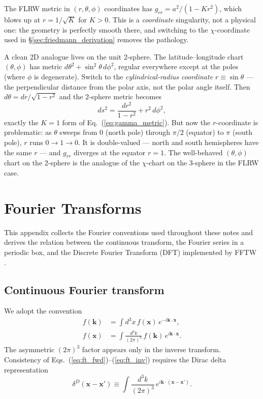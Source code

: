 \documentclass[12pt]{article}
\newcommand{\bx}{\mathbf{x}}
\newcommand{\bk}{\mathbf{k}}
\begin{document}
The FLRW metric in $(r,\theta,\phi)$ coordinates has
$g_{rr} = a^2/(1-Kr^2)$, which blows up at $r = 1/\sqrt{K}$ for
$K>0$.  This is a \emph{coordinate} singularity, not a physical one:
the geometry is perfectly smooth there, and switching to the
$\chi$-coordinate used in \S\ref{sec:friedmann_derivation} removes the
pathology.

A clean 2D analogue lives on the unit 2-sphere.  The
latitude--longitude chart $(\theta,\phi)$ has metric
$d\theta^2 + \sin^2\theta\,d\phi^2$, regular everywhere except at the
poles (where $\phi$ is degenerate).  Switch to the
\emph{cylindrical-radius coordinate} $r \equiv \sin\theta$ --- the
perpendicular distance from the polar axis, not the polar angle
itself.  Then $d\theta = dr/\sqrt{1-r^2}$ and the 2-sphere metric
becomes
%
\begin{equation}
  ds^2 = \frac{dr^2}{1-r^2} + r^2\,d\phi^2,
\end{equation}
%
exactly the $K=1$ form of Eq.~(\ref{eq:gamma_metric}).  But now the
$r$-coordinate is problematic: as $\theta$ sweeps from $0$ (north
pole) through $\pi/2$ (equator) to $\pi$ (south pole), $r$ runs
$0\to 1\to 0$.  It is double-valued --- north and south hemispheres
have the same $r$ --- and $g_{rr}$ diverges at the equator $r=1$.
The well-behaved $(\theta,\phi)$ chart on the 2-sphere is the
analogue of the $\chi$-chart on the 3-sphere in the FLRW case.

\section{Fourier Transforms}
\label{app:fft}

This appendix collects the Fourier conventions used throughout these
notes and derives the relation between the continuous transform, the
Fourier series in a periodic box, and the Discrete Fourier Transform
(DFT) implemented by FFTW \citep{Jeong2010}.

\subsection{Continuous Fourier transform}
\label{app:fft_cont}

We adopt the convention
%
\begin{align}
  f(\bk) &= \int d^3x\, f(\bx)\,e^{-i\bk\cdot\bx},
  \label{eq:ft_fwd}\\
  f(\bx) &= \int \frac{d^3k}{(2\pi)^3}\, f(\bk)\,e^{i\bk\cdot\bx}.
  \label{eq:ft_inv}
\end{align}
%
The asymmetric $(2\pi)^3$ factor appears only in the inverse
transform.  Consistency of Eqs.~(\ref{eq:ft_fwd})--(\ref{eq:ft_inv})
requires the Dirac delta representation
%
\begin{equation}
  \delta^D(\bx - \bx') \equiv
    \int \frac{d^3k}{(2\pi)^3}\,e^{i\bk\cdot(\bx-\bx')}.
  \label{eq:dirac}
\end{equation}
\end{document}
